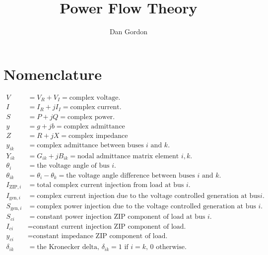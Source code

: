 \documentclass[10pt]{article}
\title{Power Flow Theory}
\author{Dan Gordon}
\date{}
\newcommand{\Vr}{{V_R}}
\newcommand{\Vi}{{V_I}}
\newcommand{\Ir}{{I_R}}
\newcommand{\Ii}{{I_I}}
\begin{document}
\maketitle

\section{Nomenclature}
\begin{align*}
V &= \Vr + \Vi = \text{complex voltage.} \\
I &= \Ir + j\Ii = \text{complex current.} \\
S &= P + jQ = \text{complex power.} \\
y &= g + jb = \text{complex admittance} \\
Z &= R + jX = \text{complex impedance} \\
y_{ik} &= \text{complex admittance between buses $i$ and $k$.} \\
Y_{ik} &= G_{ik} + jB_{ik} = \text{nodal admittance matrix element $i, k$.} \\
\theta_{i} &= \text{the voltage angle of bus $i$.} \\
\theta_{ik} &= \theta_i - \theta_k = \text{the voltage angle difference between buses $i$ and $k$.} \\
I_{\text{ZIP},i} &= \text{total complex current injection from load at bus $i$.} \\
I_{\text{gen},i} &= \text{complex current injection due to the voltage controlled generation at bus $i$.} \\
S_{\text{gen},i} &= \text{complex power injection due to the voltage controlled generation at bus $i$.} \\
S_{ci} &= \text{constant power injection ZIP component of load at bus $i$.} \\
I_{ci} &= \text{constant current injection ZIP component of load.} \\
y_{ci} &= \text{constant impedance ZIP component of load.} \\
\delta_{ik} &= \text{the Kronecker delta, $\delta_{ik} = 1$ if $i = k$, 0 otherwise.}
\end{align*}
\end{document}
